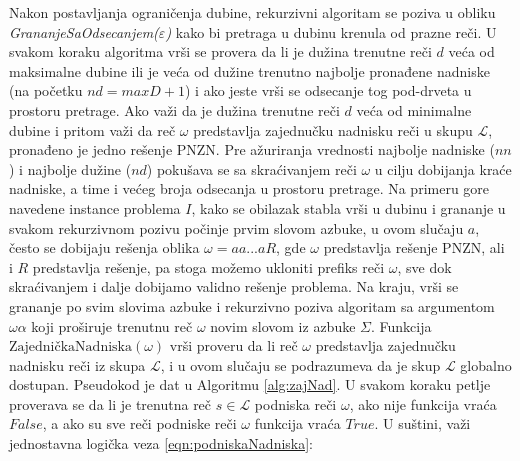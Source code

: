 \documentclass[12pt,oneside]{memoir}
\begin{document}
Nakon postavljanja ograničenja dubine, rekurzivni algoritam se poziva
u obliku \textit{GrananjeSaOdsecanjem($\varepsilon$)} kako bi pretraga u dubinu krenula od prazne reči.
U svakom koraku algoritma vrši se provera da li je dužina trenutne reči $d$ veća od maksimalne dubine ili je veća od
dužine trenutno najbolje pronađene nadniske (na početku $nd=maxD + 1$) i ako jeste vrši se odsecanje tog pod-drveta u prostoru
pretrage. Ako važi da je dužina trenutne reči $d$ veća od minimalne dubine i pritom važi da reč
$\omega$ predstavlja zajednučku nadnisku reči u skupu $\mathcal{L}$, pronađeno je jedno rešenje PNZN.
Pre ažuriranja vrednosti najbolje nadniske ($nn$) i najbolje dužine ($nd$) pokušava se sa skraćivanjem
reči $\omega$ u cilju dobijanja kraće nadniske, a time i većeg broja odsecanja u prostoru pretrage.
Na primeru gore navedene instance problema $I$, kako se obilazak stabla vrši u dubinu i grananje u svakom
rekurzivnom pozivu počinje prvim slovom azbuke, u ovom slučaju $a$, često se dobijaju rešenja
oblika $\omega=aa...aR$, gde $\omega$ predstavlja rešenje PNZN, ali i $R$ predstavlja rešenje, pa stoga
možemo ukloniti prefiks reči $\omega$, sve dok skraćivanjem i dalje dobijamo validno rešenje problema.
Na kraju, vrši se grananje po svim slovima azbuke i rekurzivno poziva algoritam sa argumentom $\omega\alpha$
koji proširuje trenutnu reč $\omega$ novim slovom iz azbuke $\Sigma$. Funkcija $\textrm{ZajedničkaNadniska}(\omega)$ vrši proveru
da li reč $\omega$ predstavlja zajednučku nadnisku reči iz skupa $\mathcal{L}$, i u ovom slučaju se podrazumeva
da je skup $\mathcal{L}$ globalno dostupan. Pseudokod je dat u Algoritmu \ref{alg:zajNad}. 
U svakom koraku petlje proverava se da li je trenutna reč $s\in\mathcal{L}$ podniska reči $\omega$,
ako nije funkcija vraća $False$, a ako su sve reči podniske reči $\omega$ funkcija vraća $True$.
U suštini, važi jednostavna logička veza \ref{eqn:podniskaNadniska}:
\end{document}
